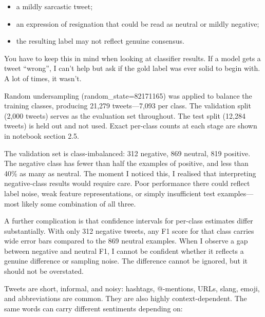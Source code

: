 \documentclass[12pt]{article}
\begin{document}
\begin{itemize}

  \item a mildly sarcastic tweet;

  \item an expression of resignation that could be read as neutral or mildly negative;

  \item the resulting label may not reflect genuine consensus.

\end{itemize}

You have to keep this in mind when looking at classifier results. If a model gets a tweet ``wrong'', I can't help but ask if the gold label was ever solid to begin with. A lot of times, it wasn't.

Random undersampling (random\_state=82171165) was applied to balance the training classes, producing 21,279 tweets---7,093 per class. The validation split (2,000 tweets) serves as the evaluation set throughout. The test split (12,284 tweets) is held out and not used. Exact per-class counts at each stage are shown in notebook section 2.5.

The validation set is class-imbalanced: 312 negative, 869 neutral, 819 positive. The negative class has fewer than half the examples of positive, and less than 40\% as many as neutral. The moment I noticed this, I realised that interpreting negative-class results would require care. Poor performance there could reflect label noise, weak feature representations, or simply insufficient test examples---most likely some combination of all three.

A further complication is that confidence intervals for per-class estimates differ substantially. With only 312 negative tweets, any F1 score for that class carries wide error bars compared to the 869 neutral examples. When I observe a gap between negative and neutral F1, I cannot be confident whether it reflects a genuine difference or sampling noise. The difference cannot be ignored, but it should not be overstated.

Tweets are short, informal, and noisy: hashtags, @-mentions, URLs, slang, emoji, and abbreviations are common. They are also highly context-dependent. The same words can carry different sentiments depending on:
\end{document}

